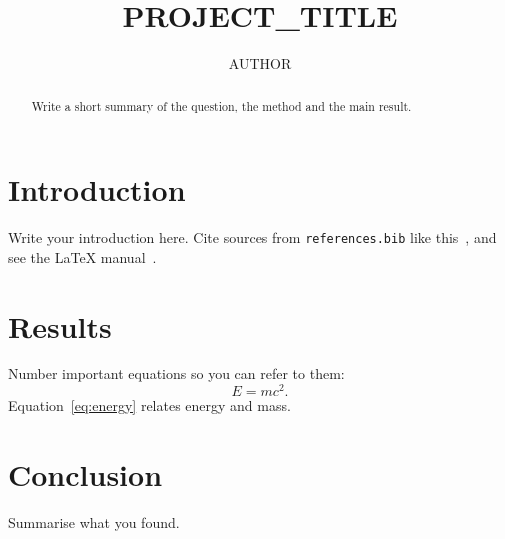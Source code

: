 \documentclass[runningheads]{llncs}
\begin{document}
\title{{{PROJECT_TITLE}}}
\author{{{AUTHOR}}}

\maketitle

\begin{abstract}
Write a short summary of the question, the method and the main result.
\end{abstract}

\section{Introduction}
Write your introduction here. Cite sources from \texttt{references.bib} like
this~\cite{einstein1905}, and see the \LaTeX{} manual~\cite{lamport1994}.

\section{Results}
Number important equations so you can refer to them:
\begin{equation}
  E = mc^2 . \label{eq:energy}
\end{equation}
Equation~\eqref{eq:energy} relates energy and mass.

\section{Conclusion}
Summarise what you found.



\end{document}
